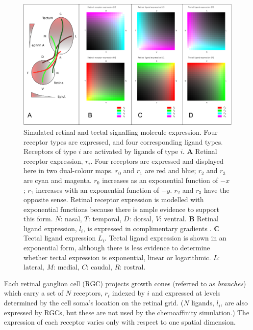 \documentclass[11pt, a4paper, draft]{article}
\begin{document}
\begin{figure}
\includegraphics[width=\linewidth]{./images/expressions_fig.png}
\caption{Simulated retinal and tectal signalling molecule expression. Four
receptor types are expressed, and four corresponding ligand types. Receptors
of type $i$ are activated by ligands of type $i$.
%
\textbf{A} Retinal receptor expression, $r_i$. Four receptors are expressed and
displayed here in two dual-colour maps. $r_0$ and $r_1$ are red and blue;
$r_2$ and $r_3$ are cyan and magenta. $r_0$ increases as an exponential
function of $-x$; $r_1$ increases with an exponential function of $-y$. $r_2$
and $r_3$ have the opposite sense. Retinal receptor expression is modelled
with exponential functions because there is ample evidence to support this
form. $N$: nasal, $T$: temporal, $D$: dorsal, $V$: ventral.
%
\textbf{B} Retinal ligand expression, $l_i$, is expressed in complimentary
gradients \citep{hornberger_modulation_1999}.
%
\textbf{C} Tectal ligand expression $L_i$. Tectal ligand expression is shown
in an exponential form,
although there is less evidence to determine whether tectal expression is
exponential, linear or logarithmic.
$L$: lateral, $M$: medial, $C$: caudal, $R$: rostral.
}
\label{f:ex}
\end{figure}

Each retinal ganglion cell (RGC) projects growth cones (referred to
as \emph{branches}) which carry a set of $N$ receptors, $r_i$ indexed by $i$ and
expressed at levels determined by the cell soma's location on the
retinal grid. ($N$ ligands, $l_i$, are also expressed by RGCs, but these are not
used by the chemoaffinity simulation.) The expression of each receptor
varies only with respect to one spatial dimension.
\end{document}
